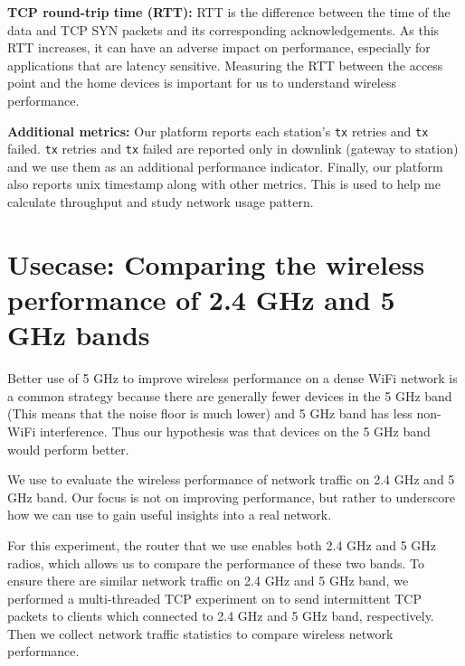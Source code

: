 \textbf{TCP round-trip time (RTT):} RTT is the difference between the time of the data and TCP SYN packets and its corresponding acknowledgements. As this RTT increases, it can have an adverse impact on performance, especially for applications that are latency sensitive. Measuring the RTT between the access point and the home devices is important for us to understand wireless performance.

\textbf{Additional metrics:} Our platform reports each station's \texttt{tx} retries and \texttt{tx} failed. \texttt{tx} retries and \texttt{tx} failed are reported only in downlink (gateway to station) and we use them as an additional performance indicator. Finally, our platform also reports unix timestamp along with other metrics. This is used to help me calculate throughput and study network usage pattern. 

\section{Usecase: Comparing the wireless performance of 2.4 GHz and 5 GHz bands}
\label{sec.usecase1}

Better use of 5 GHz to improve wireless performance on a dense WiFi network is a common strategy because there are generally fewer devices in the 5 GHz band (This means that the noise floor is much lower) and 5 GHz band has less non-WiFi interference. Thus our hypothesis was that devices on the 5 GHz band would perform better.

We use \sysname to evaluate the wireless performance of network traffic on 2.4 GHz and 5 GHz band. Our focus is not on improving performance, but rather to underscore how we can use \sysname to gain useful insights into a real network.

For this experiment, the router that we use enables both 2.4 GHz and 5 GHz radios, which allows us to compare the performance of these two bands. To ensure there are similar network traffic on 2.4 GHz and 5 GHz band, we performed a multi-threaded TCP experiment on \sysname to send intermittent TCP packets to clients which connected to 2.4 GHz and 5 GHz band, respectively. Then we collect network traffic statistics to compare wireless network performance.

